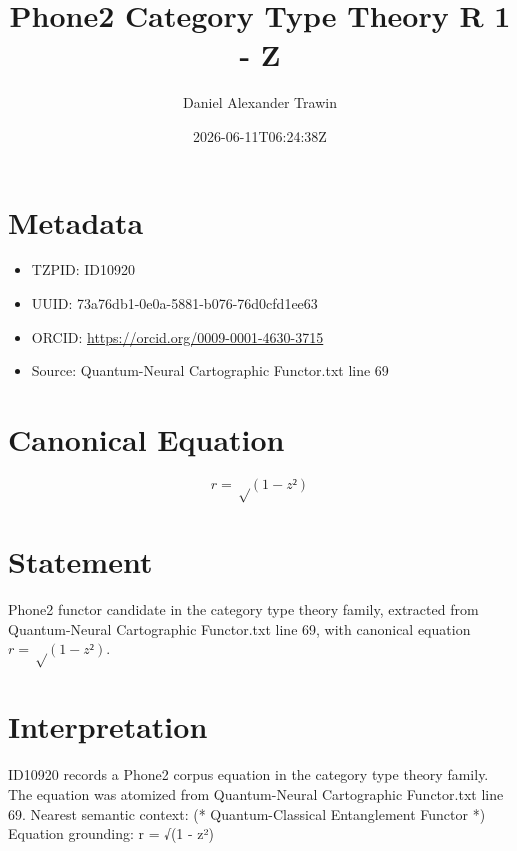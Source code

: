 \documentclass[11pt]{article}
\title{Phone2 Category Type Theory R 1 - Z}
\author{Daniel Alexander Trawin}
\date{2026-06-11T06:24:38Z}
\begin{document}
\maketitle
\section*{Metadata}
\begin{itemize}
\item TZPID: ID10920
\item UUID: 73a76db1-0e0a-5881-b076-76d0cfd1ee63
\item ORCID: \url{https://orcid.org/0009-0001-4630-3715}
\item Source: Quantum-Neural Cartographic Functor.txt line 69
\end{itemize}
\section*{Canonical Equation}
\[
r = √(1 - z²)
\]
\section*{Statement}
Phone2 functor candidate in the category type theory family, extracted from Quantum-Neural Cartographic Functor.txt line 69, with canonical equation $r = √(1 - z²)$.
\section*{Interpretation}
ID10920 records a Phone2 corpus equation in the category type theory family. The equation was atomized from Quantum-Neural Cartographic Functor.txt line 69. Nearest semantic context: (* Quantum-Classical Entanglement Functor *) Equation grounding: r = √(1 - z²)
\end{document}
